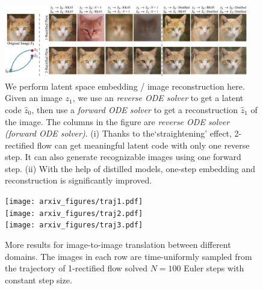 \begin{figure}
    \centering
    \includegraphics[width=0.95\textwidth]{arxiv_figures/image_reconstruction_new.jpeg}
    \caption{
    We perform latent space embedding / image reconstruction here. Given an image $z_1$, we use an \emph{reverse ODE solver} to get a latent code $\hat{z}_0$, then use a \emph{forward ODE solver} to get a reconstruction $\hat{z}_1$ of the image. The columns in the figure are \emph{reverse ODE solver (forward ODE solver)}. (i) Thanks to the`straightening' effect, 2-rectified flow can get meaningful latent code with only one reverse step. It can also generate recognizable images using one forward step. 
    (ii) With the help of distilled models, one-step embedding and reconstruction is significantly improved. 
    }
    \label{fig:image_reconstruction}
\end{figure}

\begin{figure}[h]
    \centering
    \texttt{[image: arxiv\_figures/traj1.pdf]} \\ 
    \texttt{[image: arxiv\_figures/traj2.pdf]}\\
    \texttt{[image: arxiv\_figures/traj3.pdf]}
    \caption{
    More results for image-to-image translation between different domains. 
    The images in each row are time-uniformly sampled from the trajectory of 1-rectified flow solved $N=100$ Euler steps with constant step size. 
    }
    \label{fig:appendix-traj1}
\end{figure}




